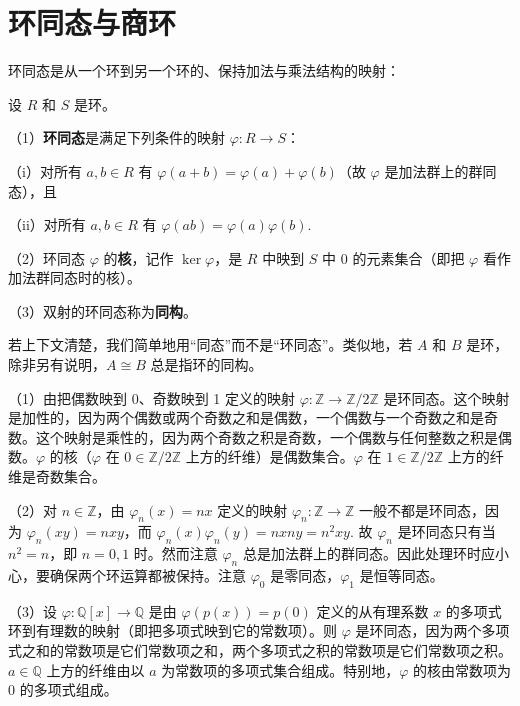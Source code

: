 \section{环同态与商环}

环同态是从一个环到另一个环的、保持加法与乘法结构的映射：

\begin{definition}
设 \(R\) 和 \(S\) 是环。

（1）\textbf{环同态}是满足下列条件的映射 \(\varphi : R \to S\)：

（i）对所有 \(a, b \in R\) 有 \(\varphi(a+b) = \varphi(a)+\varphi(b)\)（故 \(\varphi\) 是加法群上的群同态），且

（ii）对所有 \(a, b \in R\) 有 \(\varphi(ab) = \varphi(a)\varphi(b)\).

（2）环同态 \(\varphi\) 的\textbf{核}，记作 \(\ker \varphi\)，是 \(R\) 中映到 \(S\) 中 0 的元素集合（即把 \(\varphi\) 看作加法群同态时的核）。

（3）双射的环同态称为\textbf{同构}。
\end{definition}

若上下文清楚，我们简单地用“同态”而不是“环同态”。类似地，若 \(A\) 和 \(B\) 是环，除非另有说明，\(A \cong B\) 总是指环的同构。

\begin{example}
（1）由把偶数映到 0、奇数映到 1 定义的映射 \(\varphi : \mathbb{Z} \to \mathbb{Z}/2\mathbb{Z}\) 是环同态。这个映射是加性的，因为两个偶数或两个奇数之和是偶数，一个偶数与一个奇数之和是奇数。这个映射是乘性的，因为两个奇数之积是奇数，一个偶数与任何整数之积是偶数。\(\varphi\) 的核（\(\varphi\) 在 \(0 \in \mathbb{Z}/2\mathbb{Z}\) 上方的纤维）是偶数集合。\(\varphi\) 在 \(1 \in \mathbb{Z}/2\mathbb{Z}\) 上方的纤维是奇数集合。

（2）对 \(n \in \mathbb{Z}\)，由 \(\varphi_n(x) = nx\) 定义的映射 \(\varphi_n : \mathbb{Z} \to \mathbb{Z}\) 一般不都是环同态，因为 \(\varphi_n(xy) = nxy\)，而 \(\varphi_n(x)\varphi_n(y) = nxny = n^2xy\). 故 \(\varphi_n\) 是环同态只有当 \(n^2 = n\)，即 \(n = 0, 1\) 时。然而注意 \(\varphi_n\) 总是加法群上的群同态。因此处理环时应小心，要确保两个环运算都被保持。注意 \(\varphi_0\) 是零同态，\(\varphi_1\) 是恒等同态。

（3）设 \(\varphi : \mathbb{Q}[x] \to \mathbb{Q}\) 是由 \(\varphi(p(x)) = p(0)\) 定义的从有理系数 \(x\) 的多项式环到有理数的映射（即把多项式映到它的常数项）。则 \(\varphi\) 是环同态，因为两个多项式之和的常数项是它们常数项之和，两个多项式之积的常数项是它们常数项之积。\(a \in \mathbb{Q}\) 上方的纤维由以 \(a\) 为常数项的多项式集合组成。特别地，\(\varphi\) 的核由常数项为 0 的多项式组成。
\end{example}

